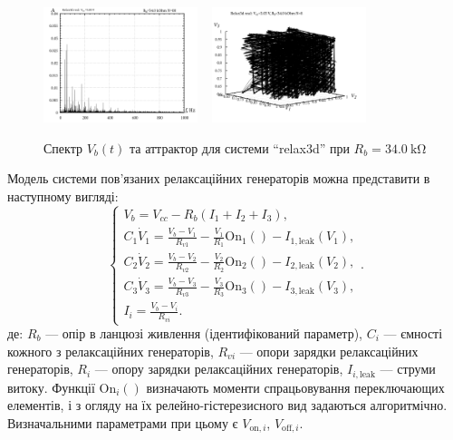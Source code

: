\documentclass[a4paper,13pt]{atuaref}
\begin{document}
\begin{figure}[htb!]
  \centerline{
    \includegraphics[width=0.40\textwidth]{p7/p/relax3d_f_08.png}
    ~
    \includegraphics[width=0.40\textwidth]{p7/p/relax3d_v1v2v3_08.png}
  }
  \caption{Спектр $V_b(t)$ та аттрактор для системи ``relax3d'' при $R_b=\SI{34.0}{\kilo\ohm}$ }
  \label{atu:f:relax3d_f_08}
\end{figure}

Модель системи пов'язаних релаксаційних генераторів можна представити в наступному вигляді:
%
\begin{equation}
  \begin{cases}
    V_b = V_{cc} - R_b ( I_1 + I_2 + I_3 ), \\
      C_1 \dot{V}_1 = \frac{V_b-V_1}{R_{v1}} - \frac{V_1}{R_1} \mathrm{On}_1() - I_{1,\mathrm{leak}}(V_1), \\
      C_2 \dot{V}_2 = \frac{V_b-V_2}{R_{v2}} - \frac{V_2}{R_2} \mathrm{On}_2() - I_{2,\mathrm{leak}}(V_2), \\
      C_3 \dot{V}_3 = \frac{V_b-V_3}{R_{v3}} - \frac{V_3}{R_3} \mathrm{On}_3() - I_{3,\mathrm{leak}}(V_3), \\
      I_i = \frac{V_b-V_i}{R_{vi}}.
  \end{cases}.
    \label{atu:eq:relax3}
\end{equation}
%
де:
$R_b$ --- опір в ланцюзі живлення (ідентифікований параметр),
$C_i$ --- ємності кожного з релаксаційних генераторів,
$R_{vi}$ --- опори зарядки релаксаційних генераторів,
$R_{i}$ --- опору зарядки релаксаційних генераторів,
$I_{i,\mathrm{leak}}$ --- струми витоку.
Функції $\mathrm{On}_i() $ визначають моменти спрацьовування переключающих
елементів, і з огляду на їх релейно-гістерезисного вид задаються алгоритмічно.
Визначальними параметрами при цьому є
$V_{\mathrm{on},i}$, $V_{\mathrm{off},i}$.
\end{document}
